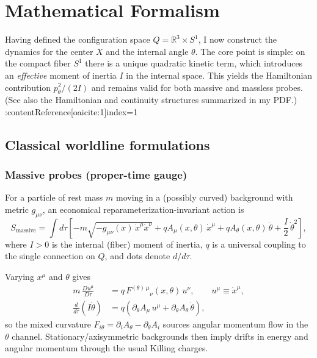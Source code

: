 \section{Mathematical Formalism}
\label{sec:math_formalism}

Having defined the configuration space $Q=\mathbb{R}^3\times S^1$, I now construct the
dynamics for the center $X$ and the internal angle $\theta$. The core point is simple:
on the compact fiber $S^1$ there is a unique quadratic kinetic term, which introduces an
\emph{effective} moment of inertia $I$ in the internal space. This yields the
Hamiltonian contribution $p_\theta^2/(2I)$ and remains valid for both massive and
massless probes. (See also the Hamiltonian and continuity structures summarized in my PDF.) :contentReference[oaicite:1]{index=1}

\subsection{Classical worldline formulations}

\subsubsection{Massive probes (proper-time gauge)}
For a particle of rest mass $m$ moving in a (possibly curved) background with metric $g_{\mu\nu}$,
an economical reparameterization-invariant action is
\begin{equation}
S_\text{massive}=\int d\tau\left[
 -m\sqrt{-g_{\mu\nu}(x)\,\dot x^\mu \dot x^\nu}
 + q A_\mu(x,\theta)\,\dot x^\mu
 + q A_\theta(x,\theta)\,\dot\theta
 + \frac{I}{2}\,\dot\theta^2
\right],
\label{eq:Smassive}
\end{equation}
where $I>0$ is the internal (fiber) moment of inertia, $q$ is a universal coupling to the
single connection on $Q$, and dots denote $d/d\tau$.

Varying $x^\mu$ and $\theta$ gives
\begin{align}
m\,\frac{D u^\mu}{D\tau} &= q\,F^{(\theta)\,\mu}{}_{\nu}(x,\theta)\,u^\nu,
\qquad u^\mu\equiv \dot x^\mu,
\label{eq:centerEOM}
\\
\frac{d}{d\tau}(I\dot\theta) &= q\left(\partial_\theta A_\mu\,u^\mu+\partial_\theta A_\theta\,\dot\theta\right),
\label{eq:fiberEOM}
\end{align}
so the mixed curvature $F_{i\theta}=\partial_i A_\theta-\partial_\theta A_i$ sources angular momentum flow in the
$\theta$ channel. Stationary/axisymmetric backgrounds then imply drifts in energy and
angular momentum through the usual Killing charges.

